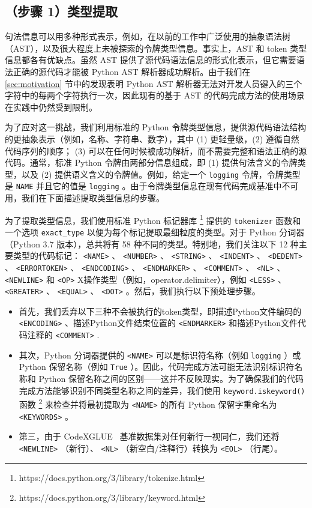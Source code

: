 \documentclass[UTF8]{article}
\begin{document}
   \subsection{（步骤 1）类型提取}   

句法信息可以用多种形式表示，例如，在以前的工作中广泛使用的抽象语法树（AST），以及很大程度上未被探索的令牌类型信息。事实上，AST 和 token 类型信息都各有优缺点。虽然 AST 提供了源代码语法信息的形式化表示，但它需要语法正确的源代码才能被 Python AST 解析器成功解析。由于我们在    \ref{sec:motivation}    节中的发现表明 Python AST 解析器无法对开发人员键入的三个字符中的每两个字符执行一次，因此现有的基于 AST 的代码完成方法的使用场景在实践中仍然受到限制。

为了应对这一挑战，我们利用标准的 Python 令牌类型信息，提供源代码语法结构的更抽象表示（例如，名称、字符串、数字），其中 (1) 更轻量级，(2) 遵循自然代码序列的顺序； (3) 可以在任何时候被成功解析，而不需要完整和语法正确的源代码。通常，标准 Python 令牌由两部分信息组成，即 (1) 提供句法含义的令牌类型，以及 (2) 提供语义含义的令牌值。例如，给定一个    \texttt{logging}    令牌，令牌类型是    \texttt{NAME}    并且它的值是    \texttt{logging}    。由于令牌类型信息在现有代码完成基准中不可用，我们在下面描述提取类型信息的步骤。

为了提取类型信息，我们使用标准 Python 标记器库    \footnote{https://docs.python.org/3/library/tokenize.html}    提供的    \texttt{tokenizer}    函数和一个选项    \texttt{exact\_type}    以便为每个标记提取最细粒度的类型。对于 Python 分词器（Python 3.7 版本），总共将有 58 种不同的类型。特别地，我们关注以下 12 种主要类型的代码标记：   \texttt{<NAME>}   、   \texttt{<NUMBER>}   、   \texttt{<STRING>}   、   \texttt{<INDENT>}   、   \texttt{<DEDENT>}   、   \texttt{<ERRORTOKEN>}   、   \texttt{<ENDCODING>}   、   \texttt{<ENDMARKER>}   、   \texttt{<COMMENT>}   、   \texttt{<NL>}   、   \texttt{<NEWLINE>}    和    \texttt{<OP>}   X操作类型（例如，operator.delimiter），例如    \texttt{<LESS>}    、    \texttt{<GREATER>}    、    \texttt{<EQUAL>}    、    \texttt{<DOT>}    。然后，我们执行以下预处理步骤。

   \begin{itemize}   \item    首先，我们丢弃以下三种不会被执行的token类型，即描述Python文件编码的   \texttt{<ENCODING>}   、描述Python文件结束位置的   \texttt{<ENDMARKER>}   和描述Python文件代码注释的   \texttt{<COMMENT>}    .
    \item    其次，Python 分词器提供的    \texttt{<NAME>}    可以是标识符名称（例如    \texttt{logging}    ）或 Python 保留名称（例如    \texttt{True}    ）。因此，代码完成方法可能无法识别标识符名称和 Python 保留名称之间的区别——这并不反映现实。为了确保我们的代码完成方法能够识别不同类型名称之间的差异，我们使用    \texttt{keyword.iskeyword()}    函数    \footnote{https://docs.python.org/3/library/keyword.html}    来检查并将最初提取为    \texttt{<NAME>}    的所有 Python 保留字重命名为    \texttt{<KEYWORDS>}    。
    \item    第三，由于 CodeXGLUE~    \cite{lu2021codexglue}    基准数据集对任何新行一视同仁，我们还将    \texttt{<NEWLINE>}   （新行）、   \texttt{<NL>}   （新空白/注释行）转换为    \texttt{<EOL>}   （行尾）。\end{itemize}   
\end{document}
